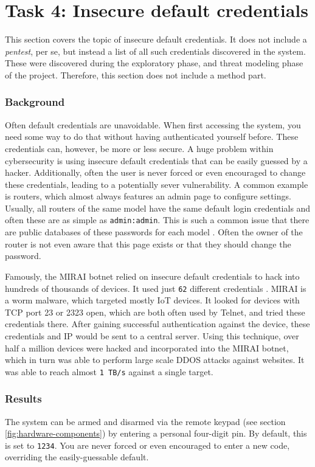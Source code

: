 \section{Task 4: Insecure default credentials}
This section covers the topic of insecure default credentials. It does not include a \textit{pentest}, per se, but instead a list of all such credentials discovered in the system. These were discovered during the exploratory phase, and threat modeling phase of the project. Therefore, this section does not include a method part.

\subsubsection{Background}
Often default credentials are unavoidable. When first accessing the system, you need some way to do that without having authenticated yourself before. These credentials can, however, be more or less secure. A huge problem within cybersecurity is using insecure default credentials that can be easily guessed by a hacker. Additionally, often the user is never forced or even encouraged to change these credentials, leading to a potentially sever vulnerability. A common example is routers, which almost always features an admin page to configure settings. Usually, all routers of the same model have the same default login credentials and often these are as simple as \texttt{admin:admin}. This is such a common issue that there are public databases of these passwords for each model . Often the owner of the router is not even aware that this page exists or that they should change the password.

Famously, the MIRAI botnet relied on insecure default credentials to hack into hundreds of thousands of devices. It used just \texttt{62} different credentials \cite{understanding-mirai}. MIRAI is a worm malware, which targeted mostly IoT devices. It looked for devices with TCP port 23 or 2323 open, which are both often used by Telnet, and tried these credentials there. After gaining successful authentication against the device, these credentials and IP would be sent to a central server. Using this technique, over half a million devices were hacked and incorporated into the MIRAI botnet, which in turn was able to perform large scale DDOS attacks against websites. It was able to reach almost \texttt{1 TB/s} against a single target.

\subsubsection{Results}
The system can be armed and disarmed via the remote keypad (see section \ref{fig:hardware-components}) by entering a personal four-digit pin. By default, this is set to \texttt{1234}. You are never forced or even encouraged to enter a new code, overriding the easily-guessable default.


